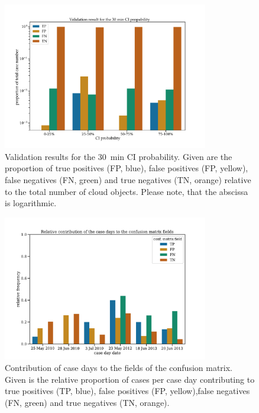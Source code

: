 \begin{figure}[htbp]
\centering
\includegraphics[width=0.8\textwidth]{Grafiken/Abbildungen/validation_plot.pdf}
\caption{Validation results for the \SI{30}{\minute} CI probability. Given are the proportion of true positives (FP, blue), false positives (FP, yellow), false negatives (FN, green) and true negatives (TN, orange) relative to the total number of cloud objects. Please note, that the abscissa is logarithmic.}
\label{fig:validation_result1}
\end{figure}

\begin{figure}[htbp]
\centering
\includegraphics[width=0.8\textwidth]{Grafiken/Abbildungen/validation_case_day_frequencies.pdf}
\caption{Contribution of case days to the fields of the confusion matrix. Given is the relative proportion of cases per case day contributing to true positives (TP, blue), false positives (FP, yellow),false negatives (FN, green) and true negatives (TN, orange).}
\label{fig:validation_case_days}
\end{figure}


